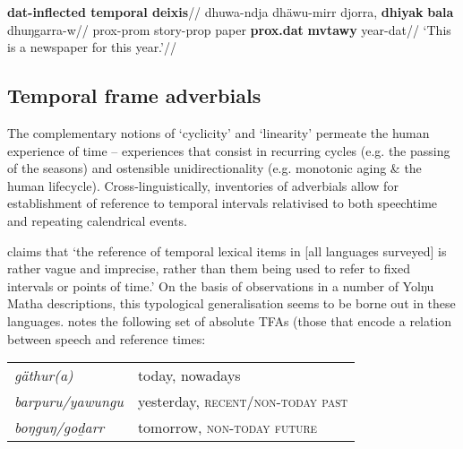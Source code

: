 \pex\begingl\glpreamble\textbf{\gls{dat}-inflected temporal deixis}//
\gla dhuwa-ndja dhäwu-mirr djorra, \textbf{dhiyak} \textbf{bala} dhuŋgarra-w//
\glb \gls{prox}-\gls{prom} story-\gls{prop} paper \textbf{\gls{prox}.\gls{dat}} \textbf{\gls{mvtawy}} year-\gls{dat}//
\glft`This is a newspaper for this year.'//\endgl\xe





\subsection{Temporal frame adverbials}\label{tfa}


 The complementary notions of `cyclicity' and `linearity' permeate the human experience of time -- experiences that consist in recurring cycles (e.g. the passing of the seasons) and ostensible unidirectionality (e.g. monotonic aging \& the human lifecycle). Cross-linguistically, inventories of adverbials allow for establishment of reference to temporal intervals relativised to both speechtime and repeating calendrical events.

\citet[147]{Austin1998} claims that  `the reference of temporal lexical items in [all languages surveyed] is rather vague and imprecise, rather than them being used to refer to fixed intervals or points of time.' On the basis of observations in a number of Yolŋu Matha descriptions, this typological generalisation seems to be borne out in these languages. \citet[158]{Wilkinson1991} notes the following set of absolute TFAs (those that encode a relation between speech and reference times:


\begin{tabular}{ll}
	\textit{gäthur(a)}	&	today, nowadays 	\\
	\textit{barpuru/yawungu}	&	yesterday, \textsc{recent/non-today past}	\\
	\textit{boŋguŋ/goḏarr\footnotemark}	& tomorrow, \textsc{non-today future}
\end{tabular}


